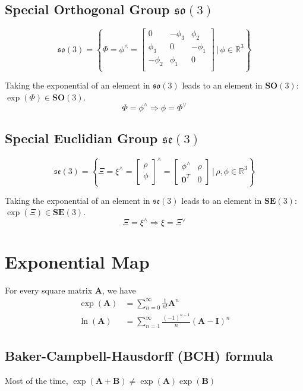 \documentclass[12pt,landscape,a4paper]{article}
\newcommand{\R}{\mathbb{R}}
\newcommand{\I}{\mathrm{\mathbf{I}}}
\newcommand{\SO}{\mathrm{\mathbf{SO}}}
\newcommand{\SE}{\mathrm{\mathbf{SE}}}
\newcommand{\so}{\mathfrak{so}}
\newcommand{\se}{\mathfrak{se}}
\newcommand{\vzero}{\mathbf{0}}
\begin{document}
\begin{multicols*}{3}
	\subsection*{Special Orthogonal Group $\so(3)$}
		$$\so(3) = \left\{ \Phi = \phi^\wedge =%
			\begin{bmatrix}
				0 & -\phi_3 & \phi_2 \\
				\phi_3 & 0 & -\phi_1 \\
				-\phi_2 & \phi_1 & 0\\
			\end{bmatrix}
		\,|\, \phi \in \R^3 \right\}$$

		Taking the exponential of an element in $\so(3)$ leads to an element in $\SO(3)$: $\exp(\Phi) \in \SO(3)$.
		$$\Phi = \phi^\wedge \Rightarrow \phi = \Phi^\vee$$

	\subsection*{Special Euclidian Group $\se(3)$}
	$$ \se(3) = \left\{ \Xi = \xi^\wedge =
		\begin{bmatrix}
			\rho \\ \phi
		\end{bmatrix}^\wedge
		=
		\begin{bmatrix}
			\phi^\wedge & \rho \\
			\vzero^T & 0
		\end{bmatrix}
		\,|\, \rho,\phi \in \R^3
	\right\}$$

		Taking the exponential of an element in $\se(3)$ leads to an element in $\SE(3)$: $\exp(\Xi) \in \SE(3)$.
		$$\Xi = \xi^\wedge \Rightarrow \xi = \Xi^\vee$$

\section{Exponential Map}
For every square matrix $\mathbf{A}$, we have
$$\begin{aligned}
	\exp(\mathbf{A}) &= \sum_{n=0}^\infty \frac{1}{n!}\mathbf{A}^n \\
	\ln(\mathbf{A}) &= \sum_{n=1}^\infty \frac{(-1)^{n-1}}{n}(\mathbf{A}-\I)^n
\end{aligned}$$
\subsection*{Baker-Campbell-Hausdorff (BCH) formula}
Most of the time, $\exp(\mathbf{A}+\mathbf{B}) \not= \exp(\mathbf{A})\exp(\mathbf{B})$


\end{multicols*}
\end{document}
